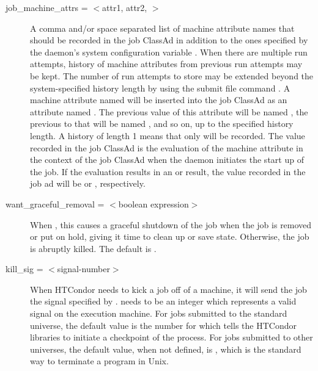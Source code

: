 \begin{description}
\label{condor-submit-job-machine-attrs}
\item[job\_machine\_attrs = $<$attr1, attr2, \Dots $>$]
A comma and/or space separated list of machine attribute names that
should be recorded in the job ClassAd in addition to the ones specified
by the  daemon's system configuration variable
.  When there are multiple run
attempts, history of machine attributes from previous run attempts
may be kept.  The number of run attempts to store may be extended
beyond the system-specified history length by using the submit file
command .  A machine
attribute named  will be inserted into the job ClassAd as an
attribute named .  The previous value of this
attribute will be named , the previous to that
will be named , and so on, up to the specified
history length.  A history of length 1 means that only 
will be recorded.  The value recorded in the job ClassAd is the evaluation
of the machine attribute in the context of the job ClassAd when
the  daemon initiates the start up of the job.  If the
evaluation results in an  or  result, the value
recorded in the job ad will be  or , respectively.


\label{condor-submit-want-graceful-removal}
\item[want\_graceful\_removal = $<$boolean expression$>$]
When , this causes a graceful shutdown of the job when the
job is removed or put on hold, giving it time to clean up or save state.
Otherwise, the job is abruptly killed.  The default is .


\label{condor-submit-kill-sig}
\item[kill\_sig = $<$signal-number$>$] When HTCondor needs to kick a job
off of a machine, it will send the job the signal specified by
.
 needs to be an integer which
represents a valid signal on the execution machine.  For jobs submitted
to the standard universe, the default value is the number for
\verb@SIGTSTP@ which tells the HTCondor libraries to initiate a checkpoint
of the process.  For jobs submitted to other universes,
the default value, when not defined,
is \verb@SIGTERM@, which is the standard way to terminate a program in Unix.  


\end{description}
